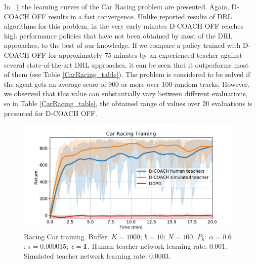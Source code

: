 In \figurename~{\ref{fig:racing_car_results1}} the learning curves of the Car Racing problem are presented. Again, D-COACH OFF results in a fast convergence. Unlike reported results of DRL algorithms for this problem, in the very early minutes D-COACH OFF reaches high performance policies that have not been obtained by most of the DRL approaches, to the best of our knowledge. If we compare a policy trained with D-COACH OFF for approximately 75 minutes by an experienced teacher against several state-of-the-art DRL approaches, it can be seen that it outperforms most of them (see Table \ref{CarRacing_table}). The problem is considered to be solved if the agent gets an average score of 900 or more over 100 random tracks. However, we observed that this value can substantially vary between different evaluations, so in Table \ref{CarRacing_table}, the obtained range of values over 20 evaluations is presented for D-COACH OFF.

\begin{figure}[t]
    \centering
    \includegraphics[width=0.8\linewidth]{imagenes/cap3/offline_car_racing_humans.pdf}
    \caption{Racing Car training. Buffer: $K = 1000$; $b = 10$; $N = 100$. $P_{h}$: $\alpha = 0.6$; $\tau = 0.000015$; $\emph{e}=\textbf{1}$. Human teacher network learning rate: $0.001$; Simulated teacher network learning rate: $0.0003$.}
    \label{fig:racing_car_results1}
\end{figure}

